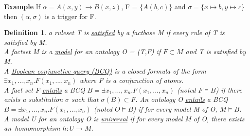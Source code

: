 \documentclass{article}
\newtheorem{defi}{Definition}
\begin{document}
\noindent \textbf{Example} If $\alpha = A(x,y) \rightarrow B(x,z)$, F = $\{A(b,c)\}$ and $\sigma = \{x \mapsto b, y \mapsto c \}$ then $(\alpha,\sigma)$ is a trigger for F.

\begin{defi}
a ruleset T is \underline{satisfied} by a factbase M if every rule of T is satisfied by M. \\
A factset M is a \underline{model} for an ontology O = (T,F) if $F \subset M$ and T is satisfied by M. \\
A \underline{Boolean conjunctive query (BCQ)} is a closed formula of the form \\ $\exists x_1,...,x_n. F(x_1,...,x_n)$ where F is a conjunction of atoms. \\
A fact set F \underline{entails} a BCQ $B = \exists x_1,...,x_n.F(x_1,...,x_n)$ (noted $F \vDash B$) if there exists a substitution $\sigma$ such that $\sigma(B) \subset F$. An ontology O \underline{entails} a BCQ $B = \exists x_1,...,x_n.F(x_1,...,x_n)$ (noted $O \vDash B$) if for every model M of O, $M \vDash B$.\\
A model U for an ontology O is \underline{universal} if for
every model M of O, there exists an\ homomorphism $h : U \to M$.
\end{defi}
\end{document}
